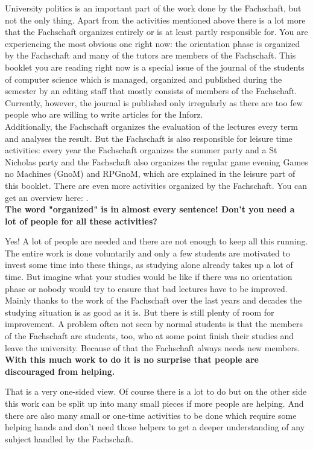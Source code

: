 {University politics is an important part of the work done by the Fachschaft, but not the only thing. Apart from the activities mentioned above there is a lot more that the Fachschaft organizes entirely or is at least partly responsible for. You are experiencing the most obvious one right now: the orientation phase is organized by the Fachschaft and many of the tutors are members of the Fachschaft. This booklet you are reading right now is a special issue of the journal of the students of computer science which is managed, organized and published during the semester by an editing staff that mostly consists of members of the Fachschaft. Currently, however, the journal is published only irregularly as there are too few people who are willing to write articles for the Inforz.\\
Additionally, the Fachschaft organizes the evaluation of the lectures every term and analyses the result. But the Fachschaft is also responsible for leisure time activities: every year the Fachschaft organizes the summer party and a St Nicholas party and the Fachschaft also organizes the regular game evening Games no Machines (GnoM) and RPGnoM, which are explained in the leisure part of this booklet. There are even more activities organized by the Fachschaft. You can get an overview here: \footnotemark[2].\\

\textbf{The word "organized" is in almost every sentence! Don't you need a lot of people for all these activities?}

Yes! A lot of people are needed and there are not enough to keep all this running. The entire work is done voluntarily and only a few students are motivated to invest some time into these things, as studying alone already takes up a lot of time. But imagine what your studies would be like if there was no orientation phase or nobody would try to ensure that bad lectures have to be improved. Mainly thanks to the work of the Fachschaft over the last years and decades the studying situation is as good as it is. But there is still plenty of room for improvement. A problem often not seen by normal students is that the members of the Fachschaft are students, too, who at some point finish their studies and leave the university. Because of that the Fachschaft always needs new members.\\

\textbf{With this much work to do it is no surprise that people are discouraged from helping.}

That is a very one-sided view. Of course there is a lot to do but on the other side this work can be split up into many small pieces if more people are helping. And there are also many small or one-time activities to be done which require some helping hands and don't need those helpers to get a deeper understanding of any subject handled by the Fachschaft.\\

}
